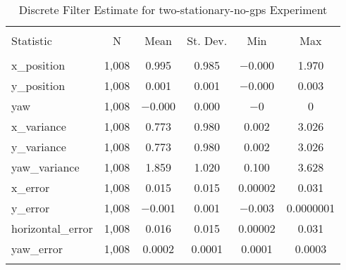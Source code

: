 
\begin{table}[h] \centering 
  \caption{Discrete Filter Estimate for two-stationary-no-gps Experiment} 
  \label{tab:two_stationary_no_gps_discrete_summary} 
\begin{tabular}{@{\extracolsep{5pt}}lccccc} 
\\[-1.8ex]\hline 
\hline \\[-1.8ex] 
Statistic & \multicolumn{1}{c}{N} & \multicolumn{1}{c}{Mean} & \multicolumn{1}{c}{St. Dev.} & \multicolumn{1}{c}{Min} & \multicolumn{1}{c}{Max} \\ 
\hline \\[-1.8ex] 
x\_position & 1,008 & 0.995 & 0.985 & $-$0.000 & 1.970 \\ 
y\_position & 1,008 & 0.001 & 0.001 & $-$0.000 & 0.003 \\ 
yaw & 1,008 & $-$0.000 & 0.000 & $-$0 & 0 \\ 
x\_variance & 1,008 & 0.773 & 0.980 & 0.002 & 3.026 \\ 
y\_variance & 1,008 & 0.773 & 0.980 & 0.002 & 3.026 \\ 
yaw\_variance & 1,008 & 1.859 & 1.020 & 0.100 & 3.628 \\ 
x\_error & 1,008 & 0.015 & 0.015 & 0.00002 & 0.031 \\ 
y\_error & 1,008 & $-$0.001 & 0.001 & $-$0.003 & 0.0000001 \\ 
horizontal\_error & 1,008 & 0.016 & 0.015 & 0.00002 & 0.031 \\ 
yaw\_error & 1,008 & 0.0002 & 0.0001 & 0.0001 & 0.0003 \\ 
\hline \\[-1.8ex] 
\end{tabular} 
\end{table} 
